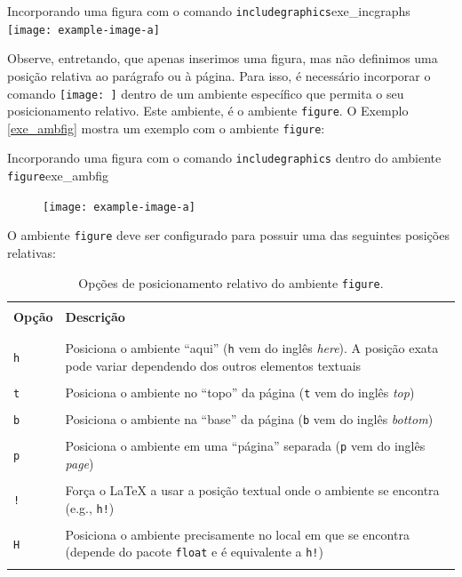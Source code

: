 \begin{texexptitled}[breakable,enhanced,middle=2mm]{Incorporando uma figura com o comando {\tt includegraphics}}{exe_incgraphs}
\texttt{[image: example-image-a]}
\end{texexptitled}

Observe, entretando, que apenas inserimos uma figura, mas não definimos uma posição relativa ao parágrafo ou à página. Para isso, é necessário incorporar o comando \texttt{\texttt{[image: ]}} dentro de um ambiente específico que permita o seu posicionamento relativo. Este ambiente, é o ambiente {\tt figure}. O Exemplo \ref{exe_ambfig} mostra um exemplo com o ambiente {\tt figure}:

\begin{texexptitled}[breakable,enhanced,middle=2mm]{Incorporando uma figura com o comando {\tt includegraphics} dentro do ambiente {\tt figure}}{exe_ambfig}
\begin{figure}[H]
\texttt{[image: example-image-a]}
\end{figure}
\end{texexptitled}

O ambiente {\tt figure} deve ser configurado para possuir uma das seguintes posições relativas:

\begin{table}[H]
\centering
\caption{Opções de posicionamento relativo do ambiente {\tt figure}.}
\label{tab:ambfig}
    \begin{tabular}{p{2cm}p{11cm}}
    \hline
    \\[-0.5em]
    \textbf{Opção} & \textbf{Descrição} \\
    \\[-0.5em]
    \hline
    \hline
    \\[-0.5em]
    {\tt h} & Posiciona o ambiente ``aqui'' ({\tt h} vem do inglês \textit{here}). A posição exata pode variar dependendo dos outros elementos textuais \\
    \\[-0.5em]
    {\tt t} & Posiciona o ambiente no ``topo'' da página ({\tt t} vem do inglês \textit{top}) \\
    \\[-0.5em]
    {\tt b} & Posiciona o ambiente na ``base'' da página ({\tt b} vem do inglês \textit{bottom}) \\
    \\[-0.5em]
    {\tt p} & Posiciona o ambiente em uma ``página'' separada ({\tt p} vem do inglês \textit{page}) \\
    \\[-0.5em]
    {\tt !} & Força o \LaTeX{} a usar a posição textual onde o ambiente se encontra (e.g., {\tt h!}) \\
    \\[-0.5em]
    {\tt H} & Posiciona o ambiente precisamente no local em que se encontra (depende do pacote {\tt float} e é equivalente a {\tt h!}) \\
    \\[-0.5em]
    \hline
    \end{tabular}
\end{table}

